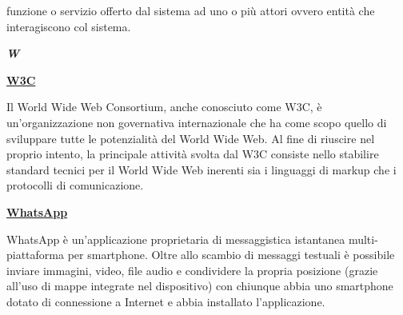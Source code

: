\medskip
\begin{addmargin}[5em]{1em}
funzione o servizio offerto dal sistema ad uno o più attori ovvero entità che interagiscono col sistema.
\end{addmargin}	

\newpage

\cleardoublepage
{}
{}
\noindent\hrulefill\hspace{4mm}\textbf{\textsl{\Huge{W}}}\hspace{4mm}\hrulefill
\vspace*{2\bigskipamount}

\begin{addmargin}[0em]{0em}
	\textbf{\underline{W3C}}
\end{addmargin}

\medskip
\begin{addmargin}[5em]{1em}
Il World Wide Web Consortium, anche conosciuto come W3C, è un'organizzazione non governativa internazionale che ha come scopo quello di sviluppare tutte le potenzialità del World Wide Web. Al fine di riuscire nel proprio intento, la principale attività svolta dal W3C consiste nello stabilire standard tecnici per il World Wide Web inerenti sia i linguaggi di markup che i protocolli di comunicazione.
\end{addmargin}
	
\bigskip
\begin{addmargin}[0em]{0em}
	\textbf{\underline{WhatsApp}}
\end{addmargin} 

\medskip
\begin{addmargin}[5em]{1em}
WhatsApp è un'applicazione proprietaria di messaggistica istantanea multi-piattaforma per smartphone. Oltre allo scambio di messaggi testuali è possibile inviare immagini, video, file audio e condividere la propria posizione (grazie all'uso di mappe integrate nel dispositivo) con chiunque abbia uno smartphone dotato di connessione a Internet e abbia installato l'applicazione.
\end{addmargin}
		
